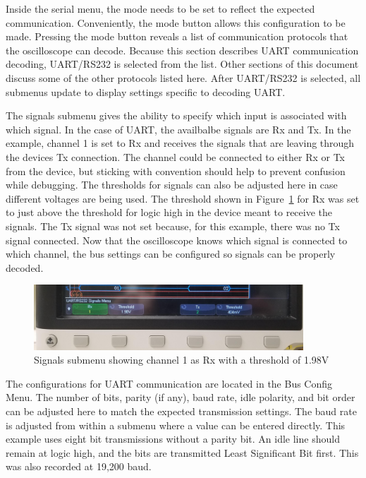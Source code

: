 \documentclass{article}
\begin{document}
  Inside the serial menu, the mode needs to be set to reflect the expected
  communication. Conveniently, the mode button allows this configuration to be
  made. Pressing the mode button reveals a list of communication protocols that
  the oscilloscope can decode. Because this section describes UART communication
  decoding, UART/RS232 is selected from the list. Other sections of this
  document discuss some of the other protocols listed here. After UART/RS232 is
  selected, all submenus update to display settings
  specific to decoding UART.\@

  The signals submenu gives the ability to specify which input is associated
  with which signal. In the case of UART, the availbalbe signals are Rx and Tx.
  In the example, channel 1 is set to Rx and receives the signals that are
  leaving through the devices Tx connection. The channel could be connected to
  either Rx or Tx from the device, but sticking with convention should help to
  prevent confusion while debugging. The thresholds for signals can also be
  adjusted here in case different voltages are being used. The threshold shown
  in Figure~\ref{fig:uart_signals_menu} for Rx was set to just above the threshold
  for logic high in the device meant to receive the signals. The Tx signal was
  not set because, for this example, there was no Tx signal connected. Now that
  the oscilloscope knows which signal is connected to which channel, the bus
  settings can be configured so signals can be properly decoded.

  \begin{figure}[h]
    \centering
    \includegraphics[width=0.9\textwidth]{signals_menu}
    \caption{Signals submenu showing channel 1 as Rx with a threshold of 1.98V}
    \label{fig:uart_signals_menu}
  \end{figure}

  The configurations for UART communication are located in the Bus Config Menu.
  The number of bits, parity (if any), baud rate, idle polarity, and bit order
  can be adjusted here to match the expected transmission settings. The baud
  rate is adjusted from within a submenu where a value can be entered directly.
  This example uses eight bit transmissions without a parity bit. An idle line
  should remain at logic high, and the bits are transmitted Least Significant
  Bit first. This was also recorded at 19,200 baud.
\end{document}
